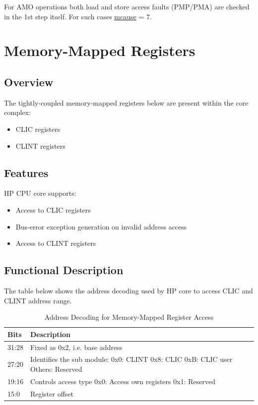 \documentclass[main\_\_EN.tex]{subfiles}
\begin{document}
For AMO operations both load and store access faults (PMP/PMA) are checked in the 1st step itself. For such cases \hyperref[regdesc:MCAUSE]{mcause} = 7.

\newpage
\section{Memory-Mapped Registers}
\label{sec:riscvcpu-tcip}

\subsection{Overview}
\label{sec:riscvcpu-tcip-overview}


The tightly-coupled memory-mapped registers below are present within the core complex:

\begin{itemize}
    \item CLIC registers
    \item CLINT registers
\end{itemize}

\subsection{Features}
\label{sec:riscvcpu-tcip-features}
HP CPU core supports:
\begin{itemize}
    \item Access to CLIC registers
    \item Bus-error exception generation on invalid address access
    \item Access to CLINT registers
\end{itemize}

\subsection{Functional Description}
\label{sec:riscvcpu-tcip-func-descr}

The table below shows the address decoding used by HP core to access CLIC and CLINT address range.

\begin{longtable}{ | l | p{5 cm} | }
\caption{Address Decoding for Memory-Mapped Register Access} \label{tab:riscvcpu-tcip-table}
\\ \hline
\rowcolor{lightgray}
Bits & Description \\ \hline
31:28 & Fixed as 0x2, i.e. base address \\ \hline
27:20 & Identifies the sub module: \newline 0x0: CLINT \newline 0x8: CLIC \newline 0xB: CLIC user \newline Others: Reserved \\ \hline
19:16 & Controls access type \newline 0x0: Access own registers \newline 0x1: Reserved\\ \hline
15:0 & Register offset \\ \hline
\end{longtable}
\end{document}
